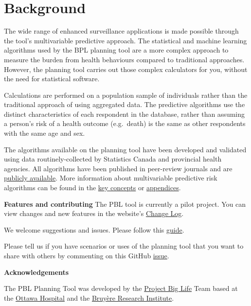 \documentclass[]{book}
\begin{document}
\hypertarget{background}{%
\chapter{Background}\label{background}}

The wide range of enhanced surveillance applications is made possible through the tool's multivariable predictive approach. The statistical and machine learning algorithms used by the BPL planning tool are a more complex approach to measure the burden from health behaviours compared to traditional approaches.\citep{manuel2018} However, the planning tool carries out those complex calculators for you, without the need for statistical software.

Calculations are performed on a population sample of individuals rather than the traditional approach of using aggregated data. The predictive algorithms use the distinct characteristics of each respondent in the database, rather than assuming a person's risk of a health outcome (e.g.~death) is the same as other respondents with the same age and sex.

The algorithms available on the planning tool have been developed and validated using data routinely-collected by Statistics Canada and provincial health agencies. All algorithms have been published in peer-review journals and are \href{https://github.com/Big-Life-Lab/predictive-algorithms}{publicly available}. More information about multivariable predictive risk algorithms can be found in the \protect\hyperlink{keyconcepts}{key concepts} or \protect\hyperlink{mport}{appendices}.

\textbf{Features and contributing}
The PBL tool is currently a pilot project. You can view changes and new features in the website's \href{http://http://planning.projectbiglife.ca/}{Change Log}.

We welcome suggestions and issues. Please follow this \href{https://github.com/Big-Life-Lab/PBL-Planning-Tool-Guidance/blob/master/contributing/CONTRIBUTING.md}{guide}.

Please tell us if you have scenarios or uses of the planning tool that you want to share with others by commenting on this GitHub \href{https://github.com/Big-Life-Lab/PBL-Planning-Tool-Guidance/issues/9}{issue}.

\textbf{Acknowledgements}

The PBL Planning Tool was developed by the \href{https://www.projectbiglife.ca}{Project Big Life} Team based at the \href{http://www.ohri.ca/home.asp}{Ottawa Hospital} and the \href{https://www.bruyere.org/en/bruyere-research-institute}{Bruyère Research Institute}.
\end{document}
